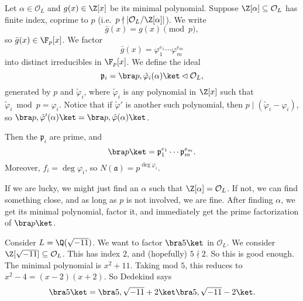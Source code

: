 \documentclass[a4paper]{article}
\begin{document}
\begin{thm}
  Let $\alpha \in \mathcal{O}_L$ and $g(x) \in \Z[x]$ be its minimal polynomial. Suppose $\Z[\alpha] \subseteq \mathcal{O}_L$ has finite index, coprime to $p$ (i.e.\ $p \nmid |\mathcal{O}_L/\Z[\alpha]|$). We write
  \[
    \bar{g}(x) = g(x) \pmod p,
  \]
  so $\bar{g}(x) \in \F_p[x]$. We factor
  \[
    \bar{g}(x) = \varphi_1^{e_1} \cdots \varphi_m^{e_m}
  \]
  into distinct irreducibles in $\F_p[x]$. We define the ideal
  \[
    \mathfrak{p}_i = \bra p, \tilde{\varphi}_i(\alpha)\ket \lhd \mathcal{O}_L,
  \]
  generated by $p$ and $\tilde{\varphi}_i$, where $\tilde{\varphi}_i$ is any polynomial in $\Z[x]$ such that $\tilde{\varphi}_i \bmod p = \varphi_i$. Notice that if $\tilde{\varphi}'$ is another such polynomial, then $p \mid (\tilde{\varphi}_i - \varphi_i)$, so $\bra p, \tilde{\varphi}'(\alpha)\ket = \bra p, \tilde{\varphi}(\alpha)\ket$.

  Then the $\mathfrak{p}_i$ are prime, and
  \[
    \bra p\ket = \mathfrak{p}_1^{e_1} \cdots \mathfrak{p}_m^{e_m}.
  \]
  Moreover, $f_i = \deg \varphi_i$, so $N(\mathfrak{a}) = p^{\deg \varphi_i}$.
\end{thm}
If we are lucky, we might just find an $\alpha$ such that $\Z[\alpha] = \mathcal{O}_L$. If not, we can find something close, and as long as $p$ is not involved, we are fine. After finding $\alpha$, we get its minimal polynomial, factor it, and immediately get the prime factorization of $\bra p\ket$.

\begin{eg}
  Consider $L = \Q(\sqrt{-11})$. We want to factor $\bra 5\ket$ in $\mathcal{O}_L$. We consider $\Z[\sqrt{-11}] \subseteq \mathcal{O}_L$. This has index $2$, and (hopefully) $5\nmid 2$. So this is good enough. The minimal polynomial is $x^2 + 11$. Taking mod $5$, this reduces to $x^2 - 4 = (x - 2)(x + 2)$. So Dedekind says
  \[
    \bra 5\ket = \bra 5, \sqrt{-11} + 2\ket\bra 5, \sqrt{-11} - 2\ket.
  \]
\end{eg}
\end{document}
